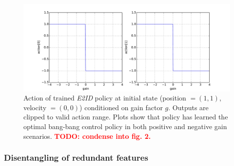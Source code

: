 \documentclass{article}
\newcommand{\TODO}[1]{\textcolor{red}{\textbf{TODO: #1}}}
\newcommand{\embed}{\emph{E2ID}}
\begin{document}
\begin{figure}
\centering
\includegraphics[width=0.85 \textwidth]{pointmass_conditional_action.pdf}
\caption{
Action of trained \embed{} policy at initial state (position $ = (1,1)$, velocity $=(0,0)$) conditioned on gain factor $g$.
Outputs are clipped to valid action range.
Plots show that policy has learned the optimal bang-bang control policy in both positive and negative gain scenarios.
\TODO{condense into fig. 2.}
}
\label{fig:conditional_action}
\end{figure}

\subsubsection{Disentangling of redundant features}
\end{document}
